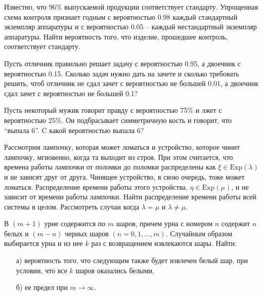 \begin{problem}
Известно, что $96\%$ выпускаемой продукции соответствует стандарту. Упрощенная схема контроля признает годным с вероятностью 
$0.98$ каждый стандартный экземпляр аппаратуры и с вероятностью $0.05$ -- каждый нестандартный экземпляр аппаратуры. Найти вероятность того, 
что изделие, прошедшее контроль, соответствует стандарту. 
\end{problem}


\begin{problem}
Пусть отличник правильно решает задачу с вероятностью 0.95, а двоечник с вероятностью 0.15. Сколько задач нужно дать на зачете и сколько требовать решить, чтоб отличник не сдал зачет с вероятностью не большей 0.01, а двоечник сдал зачет с вероятностью не большей 0.1?
\end{problem}


\begin{problem}
Пусть некоторый мужик говорит правду с вероятностью 75\% и лжет с 
вероятностью 25\%. Он подбрасывает симметричную кость и говорит, 
что ``выпала 6''. C какой вероятностью выпала 6?
\end{problem}

\begin{problem}
Рассмотрим лампочку, которая может ломаться и устройство, которое чинит лампочку, мгновенно, когда та выходит из строя. При этом считается, что времена работы лампочки от поломки до поломки распределены как $\xi \in \text{Exp}(\lambda)$ и не зависят друг от друга. Чинящее устройство, в свою очередь, тоже может ломаться. Распределение времени работы этого устройства, $\eta \in \text{Exp}(\mu)$, и не зависит от времени работы лампочки. Найти распределение времени работы всей системы в целом. Рассмотреть случаи когда $\lambda = \mu$ и $\lambda \neq \mu$.
\end{problem}



\begin{problem}
В $(m+1)$ урне содержится по $m$ шаров, причем урна с номером $n$ содержит $n$ белых и $(m-n)$ черных шаров $(n = 0,1,\ldots,m)$. 
Случайным образом выбирается урна и из нее $k$ раз с возвращением извлекаются шары. Найти: 
\begin{enumerate}
\item[а)] вероятность того, что следующим также будет извлечен белый шар, при условии, что все $k$ шаров оказались белыми, 
\item[б)] ее предел при $m\to\infty$. 
\end{enumerate}
\end{problem}

